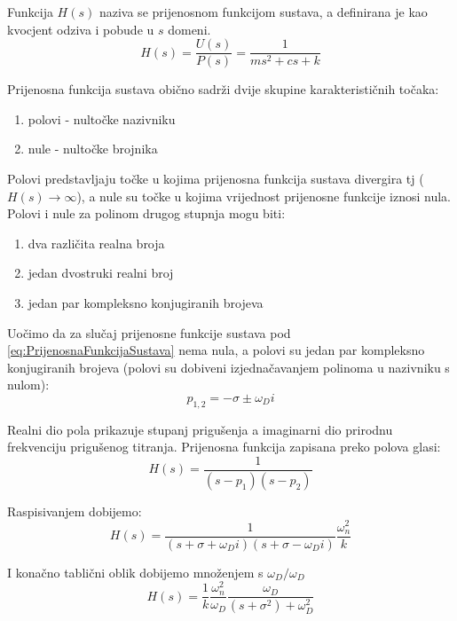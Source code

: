 Funkcija $H(s)$ naziva se prijenosnom funkcijom sustava, a definirana je kao
kvocjent odziva i pobude u $s$ domeni.
\begin{equation} \label{eq:PrijenosnaFunkcijaSustava}
    H(s)=\frac{U(s)}{P(s)} = \frac{1}{ms^2+cs+k}%
\end{equation}

Prijenosna funkcija sustava obično sadrži dvije skupine karakterističnih točaka:
\begin{enumerate}
    \item polovi - nultočke nazivniku
    \item nule - nultočke brojnika
\end{enumerate}

Polovi predstavljaju točke u kojima prijenosna funkcija sustava divergira tj
($H(s)\to\infty$), a nule su točke u kojima vrijednost prijenosne funkcije iznosi
nula. Polovi i nule za polinom drugog stupnja mogu biti:
\begin{enumerate}
    \item dva različita realna broja
    \item jedan dvostruki realni broj
    \item jedan par kompleksno konjugiranih brojeva
\end{enumerate}

Uočimo da za slučaj prijenosne funkcije sustava pod
\eqref{eq:PrijenosnaFunkcijaSustava} nema nula, a polovi su jedan par kompleksno
konjugiranih brojeva (polovi su dobiveni izjednačavanjem polinoma u nazivniku s
nulom):
\begin{equation}
    p_{1,2} = -\sigma\pm\omega_Di
\end{equation}

Realni dio pola prikazuje stupanj prigušenja  a
imaginarni dio prirodnu frekvenciju prigušenog titranja. Prijenosna funkcija
zapisana preko polova glasi:
\begin{equation}
    H(s)=\frac{1}{(s-p_1)(s-p_2)}
\end{equation}

Raspisivanjem dobijemo:
\begin{equation}
    H(s)=\frac{1}{(s+\sigma+\omega_Di)(s+\sigma-\omega_Di)}\frac{\omega_n^2}{k}
\end{equation}

I konačno tablični oblik dobijemo množenjem s $\omega_D/\omega_D$
\begin{equation}
    H(s)=\frac{1}{k}\frac{\omega_n^2}{\omega_D}\frac{\omega_D}{(s+\sigma^2)+\omega_D^2}
\end{equation}

